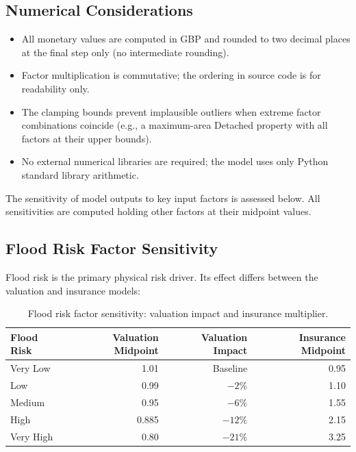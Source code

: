 \documentclass[11pt,a4paper]{article}
\begin{document}
\subsection{Numerical Considerations}

\begin{itemize}
    \item All monetary values are computed in GBP and rounded to two
          decimal places at the final step only (no intermediate rounding).
    \item Factor multiplication is commutative; the ordering in source code
          is for readability only.
    \item The clamping bounds prevent implausible outliers when extreme
          factor combinations coincide (e.g., a maximum-area Detached
          property with all factors at their upper bounds).
    \item No external numerical libraries are required; the model uses
          only Python standard library arithmetic.
\end{itemize}


\mkmsensitivity

The sensitivity of model outputs to key input factors is assessed below.
All sensitivities are computed holding other factors at their midpoint
values.



\subsection{Flood Risk Factor Sensitivity}

Flood risk is the primary physical risk driver. Its effect differs
between the valuation and insurance models:

\begin{table}[H]
\centering
\caption{Flood risk factor sensitivity: valuation impact and insurance multiplier.}
\label{tab:flood_sensitivity}
\begin{tabular}{lrrr}
\toprule
\textbf{Flood Risk} & \textbf{Valuation Midpoint} & \textbf{Valuation Impact} & \textbf{Insurance Midpoint} \\
\midrule
Very Low  & 1.01 & Baseline  & 0.95 \\
Low       & 0.99 & $-2\%$    & 1.10 \\
Medium    & 0.95 & $-6\%$    & 1.55 \\
High      & 0.885 & $-12\%$  & 2.15 \\
Very High & 0.80 & $-21\%$   & 3.25 \\
\bottomrule
\end{tabular}
\end{table}
\end{document}
